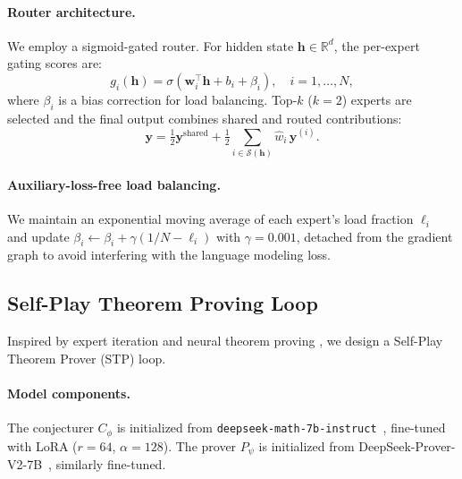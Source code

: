 \documentclass[11pt,a4paper]{article}
\newcommand{\R}{\mathbb{R}}
\begin{document}
\paragraph{Router architecture.}
We employ a sigmoid-gated router. For hidden state $\mathbf{h} \in \R^{d}$, the per-expert gating scores are:
\begin{equation}
g_i(\mathbf{h}) = \sigma(\mathbf{w}_i^\top \mathbf{h} + b_i + \beta_i), \quad i = 1, \ldots, N,
\label{eq:router}
\end{equation}
where $\beta_i$ is a bias correction for load balancing. Top-$k$ ($k{=}2$) experts are selected and the final output combines shared and routed contributions:
\begin{equation}
\mathbf{y} = \tfrac{1}{2}\mathbf{y}^{\text{shared}} + \tfrac{1}{2}\sum_{i \in \mathcal{S}(\mathbf{h})} \hat{w}_i \, \mathbf{y}^{(i)}.
\label{eq:moe_final_output}
\end{equation}

\paragraph{Auxiliary-loss-free load balancing.}
We maintain an exponential moving average of each expert's load fraction $\ell_i$ and update $\beta_i \leftarrow \beta_i + \gamma(1/N - \ell_i)$ with $\gamma{=}0.001$, detached from the gradient graph to avoid interfering with the language modeling loss.

\subsection{Self-Play Theorem Proving Loop}
\label{sec:stp}

Inspired by expert iteration \citep{anthony2017thinking} and neural theorem proving \citep{polu2023formal}, we design a Self-Play Theorem Prover (STP) loop.

\paragraph{Model components.}
The conjecturer $C_\phi$ is initialized from \texttt{deepseek-math-7b-instruct}~\citep{shao2024deepseekmath}, fine-tuned with LoRA ($r{=}64$, $\alpha{=}128$). The prover $P_\psi$ is initialized from DeepSeek-Prover-V2-7B~\citep{xin2024deepseekproverv2}, similarly fine-tuned.
\end{document}

